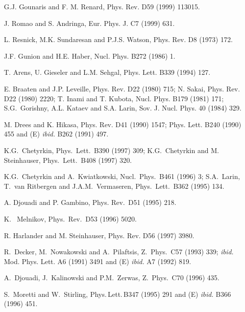 \begin{thebibliography}{999}
G.J. Gounaris and F. M. Renard, Phys. Rev. D59 (1999) 113015.

 J. Romao and S. Andringa, Eur. Phys. J. C7 (1999) 631.    

 L. Resnick, M.K. Sundaresan and P.J.S. Watson, Phys. Rev.
D8 (1973) 172.

 J.F. Gunion and H.E. Haber, Nucl. Phys. B272 (1986) 1. 

 T. Arens, U. Gieseler and L.M. Sehgal, Phys.
Lett. B339 (1994) 127. 

 E. Braaten and J.P. Leveille, Phys. Rev. D22 (1980) 715; 
N. Sakai, Phys. Rev. D22 (1980) 2220; 
T. Inami and T. Kubota, Nucl. Phys. B179 (1981) 171; 
S.G.\ Gorishny, A.L. Kataev and S.A. Larin, Sov. J. Nucl. Phys. 40
(1984) 329.

 M. Drees and K. Hikasa, Phys. Rev. D41 (1990) 1547; 
\ib Phys.  Lett. B240 (1990) 455 and (E) {\it ibid.} B262 (1991) 497.

 K.G.~Chetyrkin, Phys.\ Lett.\ B390 (1997) 309;
K.G.~Chetyrkin and M. Steinhauser, Phys.\ Lett.\ B408 (1997) 320.

 K.G.~Chetyrkin and A.~Kwiatkowski, Nucl.\ Phys.\ 
B461 (1996) 3; 
S.A.\ Larin, T.\ van Ritbergen and J.A.M.\ Vermaseren, Phys.\ Lett.\ B362
(1995) 134.

A. Djouadi and P. Gambino, Phys. Rev.~D51 (1995) 218.

 K. \ Melnikov, Phys.\ Rev.\ D53 (1996) 5020. 

R. Harlander and M. Steinhauser, Phys. Rev. D56 (1997) 3980. 

\bibitem{Three-Body2} R.\ Decker, M.\ Nowakowski and A.\ Pilaftsis, Z.\ Phys.\
C57 (1993) 339; {\it ibid.} Mod. Phys. Lett. A6 (1991) 3491 and (E) 
{\it ibid.} A7 (1992) 819.

A.\ Djouadi, J.\ Kalinowski and P.M.\ Zerwas, Z.\ Phys.\ C70 (1996) 435.

 S.\ Moretti and W.\ Stirling, Phys.\,Lett.\,B347 
(1995) 291 and (E) {\it ibid.} B366 (1996) 451.


\end{thebibliography}
